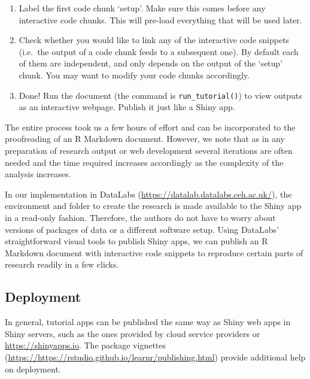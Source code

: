 

\begin{enumerate}
\def\labelenumi{\arabic{enumi}.}
\setcounter{enumi}{3}
\tightlist
\item
  Label the first code chunk `setup'. Make sure this comes before any
  interactive code chunks. This will pre-load everything that will be
  used later.
\item
  Check whether you would like to link any of the interactive code
  snippets (i.e.~the output of a code chunk feeds to a subsequent one).
  By default each of them are independent, and only depends on the
  output of the `setup' chunk. You may want to modify your code chunks
  accordingly.
\item
  Done! Run the document (the command is \texttt{run\_tutorial()}) to
  view outputs as an interactive webpage. Publish it just like a Shiny
  app.
\end{enumerate}

The entire process took us a few hours of effort and can be incorporated
to the proofreading of an R Markdown document. However, we note that as
in any preparation of research output or web development several
iterations are often needed and the time required increases accordingly
as the complexity of the analysis increases.

In our implementation in DataLabs
(\url{https://datalab.datalabs.ceh.ac.uk/}), the environment and folder
to create the research is made available to the Shiny app in a read-only
fashion. Therefore, the authors do not have to worry about versions of
packages of data or a different software setup. Using DataLabs'
straightforward visual tools to publish Shiny apps, we can publish an R
Markdown document with interactive code snippets to reproduce certain
parts of research readily in a few clicks.

\hypertarget{deployment}{%
\subsection{Deployment}\label{deployment}}

In general,  tutorial apps can be published the same way
as Shiny web apps in Shiny servers, such as the ones provided by cloud
service providers or \url{https://shinyapps.io}. The 
package vignettes
(\url{https://https://rstudio.github.io/learnr/publishing.html}) provide
additional help on deployment.

